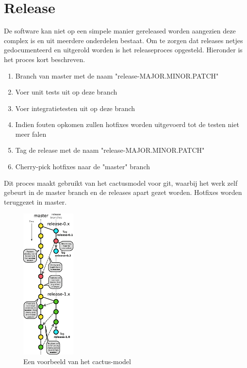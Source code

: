 \chapter{Release}

De software kan niet op een simpele manier gereleased worden aangezien deze complex is en uit meerdere onderdelen bestaat. Om te zorgen dat releases netjes gedocumenteerd en uitgerold worden is het releaseproces opgesteld. Hieronder is het proces kort beschreven.

\begin{enumerate}
	\item Branch van master met de naam "release-MAJOR.MINOR.PATCH"
	\item Voer unit tests uit op deze branch
	\item Voer integratietesten uit op deze branch
	\item Indien fouten opkomen zullen hotfixes worden uitgevoerd tot de testen niet meer falen
	\item Tag de release met de naam "release-MAJOR.MINOR.PATCH"
	\item Cherry-pick hotfixes naar de "master" branch
\end{enumerate}

Dit proces maakt gebruikt van het cactusmodel voor git, waarbij het werk zelf gebeurt in de master branch en de releases apart gezet worden. Hotfixes worden teruggezet in master.
\begin{figure}[h]
	\centering
	\includegraphics[height=7.7cm]{figures/cactus-model-100}	
	\caption{Een voorbeeld van het cactus-model}
	\label{fig:branch1}
\end{figure}

